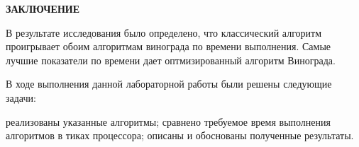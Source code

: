 \begin{center}
    \textbf{ЗАКЛЮЧЕНИЕ}
\end{center}

В результате исследования было определено, что классический алгоритм
проигрывает обоим алгоритмам винограда по времени выполнения. Самые лучшие
показатели по времени дает оптмизированный алгоритм Винограда.


В ходе выполнения данной лабораторной работы были решены следующие задачи:
\begin{itemize}
	\itemm реализованы указанные алгоритмы;
        \itemm сравнено требуемое время выполнения алгоритмов в тиках процессора;
        \itemm описаны и обоснованы полученные результаты.
\end{itemize}
